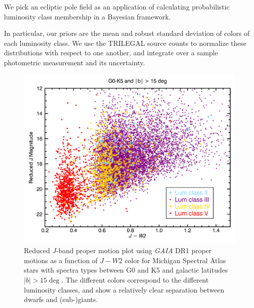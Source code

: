 We pick an ecliptic pole field as an application of calculating probabilistic luminosity class membership in a Bayesian framework.

In particular, our priors are the mean and robust standard deviation of colors of each luminosity class. We use the TRILEGAL source counts to normalize these distributions with respect to one another, and integrate over a sample photometric measurement and its uncertainty.


\begin{figure}[t]
  \begin{center}
      \includegraphics[width=1.0\textwidth,clip=true]{Figures/absolute_j/plot-J-W2-G0-K5-b15-0.png}
 \end{center}
 \caption{Reduced $J$-band proper motion plot using \textit{GAIA} DR1 proper motions as a function of $J-W2$ color for Michigan Spectral Atlas stars with spectra types between G0 and K5 and galactic latitudes $|b|>15\deg$.  The different colors correspond to the different luminosity classes, and show a relatively clear separation between dwarfs and (sub-)giants.}
\end{figure}


